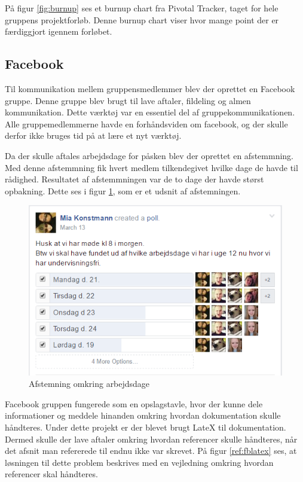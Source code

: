 \noindent På figur \ref{fig:burnup} ses et burnup chart fra Pivotal Tracker, taget for hele gruppens projektforløb. Denne burnup chart viser hvor mange point der er færdiggjort igennem forløbet.

\subsection{Facebook}
Til kommunikation mellem gruppensmedlemmer blev der oprettet en Facebook \cite{facebook} gruppe. Denne gruppe blev brugt til lave aftaler, fildeling og almen kommunikation. Dette værktøj var en essentiel del af gruppekommunikationen. Alle gruppemedlemmerne havde en forhåndsviden om facebook, og der skulle derfor ikke bruges tid på at lære et nyt værktøj. \newline

\noindent Da der skulle aftales arbejdsdage for påsken blev der oprettet en afstemmning. Med denne afstemmning fik hvert medlem tilkendegivet hvilke dage de havde til rådighed. Resultatet af afstemmningen var de to dage der havde størst opbakning. Dette ses i figur \ref{ref:fbpoll}, som er et udsnit af afstemningen.
\begin{figure}[H]
	\centering
	\includegraphics[scale=0.6]{Projektgennemfoerelse/images/fbpoll}
	\caption{Afstemning omkring arbejdsdage}
	\label{ref:fbpoll}
\end{figure}

\noindent Facebook gruppen fungerede som en opslagstavle, hvor der kunne dele informationer og meddele hinanden omkring hvordan dokumentation skulle håndteres. Under dette projekt er der blevet brugt LateX til dokumentation. Dermed skulle der lave aftaler omkring hvordan referencer skulle håndteres, når det afsnit man refererede til endnu ikke var skrevet. På figur \ref{ref:fblatex} ses, at løsningen til dette problem beskrives med en vejledning omkring hvordan referencer skal håndteres.

